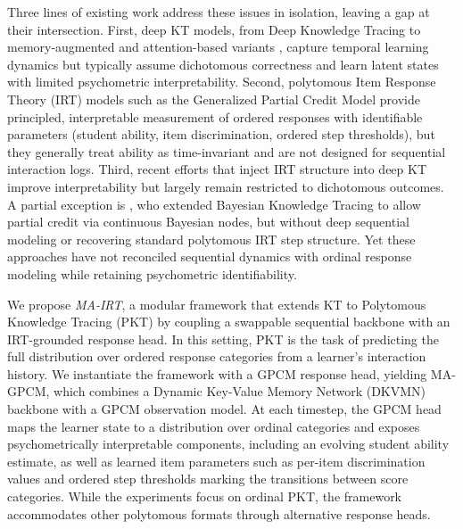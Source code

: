 \documentclass[pdflatex,sn-apa]{sn-jnl}
\begin{document}
Three lines of existing work address these issues in isolation, leaving a gap at their intersection. First, deep KT models, from Deep Knowledge Tracing \citep[DKT;][]{piech_deep_2015} to memory-augmented and attention-based variants \citep{zhang_dynamic_2017, pandey_self-attentive_2019}, capture temporal learning dynamics but typically assume dichotomous correctness and learn latent states with limited psychometric interpretability. Second, polytomous Item Response Theory (IRT) models such as the Generalized Partial Credit Model \citep[GPCM;][]{van_der_linden_generalized_1997} provide principled, interpretable measurement of ordered responses with identifiable parameters (student ability, item discrimination, ordered step thresholds), but they generally treat ability as time-invariant and are not designed for sequential interaction logs. Third, recent efforts that inject IRT structure into deep KT \citep{yeung_deep-irt_2019, converse_irt_kt_2021} improve interpretability but largely remain restricted to dichotomous outcomes. A partial exception is \citet{wang_extending_2013}, who extended Bayesian Knowledge Tracing to allow partial credit via continuous Bayesian nodes, but without deep sequential modeling or recovering standard polytomous IRT step structure. Yet these approaches have not reconciled sequential dynamics with ordinal response modeling while retaining psychometric identifiability.

We propose \textit{MA-IRT}, a modular framework that extends KT to Polytomous Knowledge Tracing (PKT) by coupling a swappable sequential backbone with an IRT-grounded response head. In this setting, PKT is the task of predicting the full distribution over ordered response categories from a learner’s interaction history. We instantiate the framework with a GPCM response head, yielding MA-GPCM, which combines a Dynamic Key-Value Memory Network (DKVMN) backbone with a GPCM observation model. At each timestep, the GPCM head maps the learner state to a distribution over ordinal categories and exposes psychometrically interpretable components, including an evolving student ability estimate, as well as learned item parameters such as per-item discrimination values and ordered step thresholds marking the transitions between score categories. While the experiments focus on ordinal PKT, the framework accommodates other polytomous formats through alternative response heads.

\end{document}
